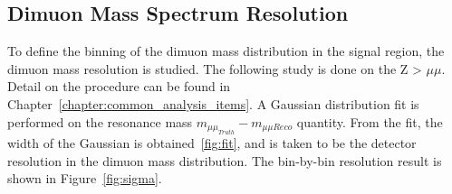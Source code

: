 
%


\subsection{Dimuon Mass Spectrum Resolution}
To define the binning of the dimuon mass distribution in the signal region, the dimuon mass resolution is studied. The following study is done on the Z > $\mu \mu$. Detail on the procedure can be found in Chapter~\ref{chapter:common_analysis_items}.
A Gaussian distribution fit is performed on the resonance mass $m_{\mu\mu_{Truth}} - m_{\mu\mu{Reco}}$ quantity. From the fit, the width of the Gaussian is obtained~\ref{fig:fit}, and is taken to be the detector resolution in the dimuon mass distribution. The bin-by-bin resolution result is shown in Figure~\ref{fig:sigma}.
    


